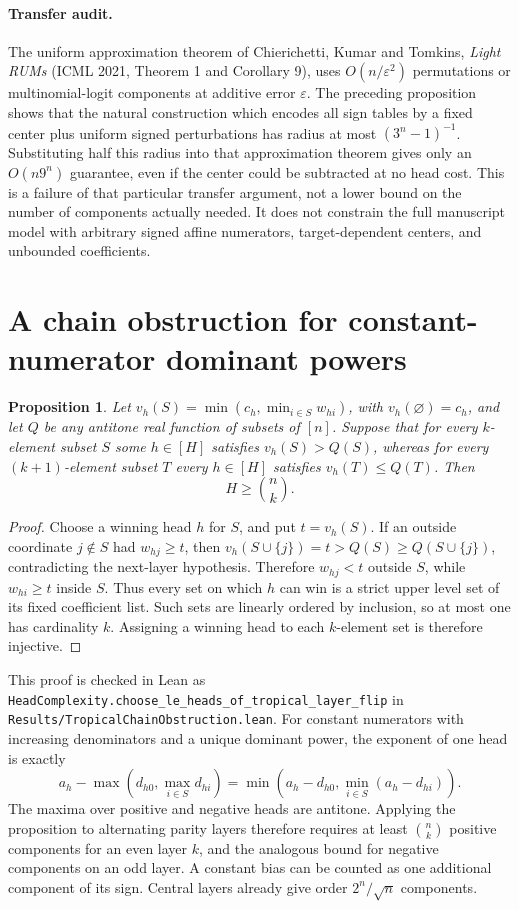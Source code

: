 \documentclass[11pt]{article}
\newtheorem{proposition}{Proposition}
\begin{document}
\paragraph{Transfer audit.}
The uniform approximation theorem of Chierichetti, Kumar and Tomkins,
\emph{Light RUMs} (ICML 2021, Theorem 1 and Corollary 9), uses
$O(n/\varepsilon^2)$ permutations or multinomial-logit components
at additive error $\varepsilon$. The preceding proposition shows
that the natural construction which encodes all sign tables by
a fixed center plus uniform signed perturbations has radius at
most $(3^n-1)^{-1}$. Substituting half this radius into that
approximation theorem gives only an $O(n9^n)$ guarantee, even if
the center could be subtracted at no head cost. This is a failure
of that particular transfer argument, not a lower bound on the
number of components actually needed. It does not constrain the
full manuscript model with arbitrary signed affine numerators,
target-dependent centers, and unbounded coefficients.

\section{A chain obstruction for constant-numerator dominant powers}

\begin{proposition}
Let $v_h(S)=\min(c_h,\min_{i\in S}w_{hi})$, with $v_h(\varnothing)=c_h$,
and let $Q$ be any antitone real function of subsets of $[n]$.
Suppose that for every $k$-element subset $S$ some $h\in[H]$ satisfies
$v_h(S)>Q(S)$, whereas for every $(k+1)$-element subset $T$ every
$h\in[H]$ satisfies $v_h(T)\leq Q(T)$. Then
\[
 H\geq\binom nk.
\]
\end{proposition}
\begin{proof}
Choose a winning head $h$ for $S$, and put $t=v_h(S)$. If an
outside coordinate $j\notin S$ had $w_{hj}\geq t$, then
$v_h(S\cup\{j\})=t>Q(S)\geq Q(S\cup\{j\})$, contradicting
the next-layer hypothesis. Therefore $w_{hj}<t$ outside $S$,
while $w_{hi}\geq t$ inside $S$. Thus every set on which $h$
can win is a strict upper level set of its fixed coefficient list.
Such sets are linearly ordered by inclusion, so at most one has
cardinality $k$. Assigning a winning head to each $k$-element set
is therefore injective.
\end{proof}

This proof is checked in Lean as
\texttt{HeadComplexity.choose\_le\_heads\_of\_tropical\_layer\_flip}
in \texttt{Results/TropicalChainObstruction.lean}.
For constant numerators with increasing denominators and a unique
dominant power, the exponent of one head is exactly
\[
 a_h-\max(d_{h0},\max_{i\in S}d_{hi})
 =\min(a_h-d_{h0},\min_{i\in S}(a_h-d_{hi})).
\]
The maxima over positive and negative heads are antitone. Applying
the proposition to alternating parity layers therefore requires
at least $\binom nk$ positive components for an even layer $k$,
and the analogous bound for negative components on an odd layer.
A constant bias can be counted as one additional component of its
sign. Central layers already give order $2^n/\sqrt n$ components.
\end{document}
